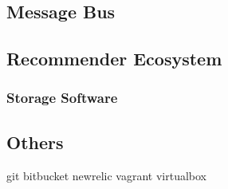 \subsection{Message Bus}

\subsection{Recommender Ecosystem}

\subsubsection{Storage Software}


\subsection{Others}

git bitbucket
newrelic
vagrant virtualbox
